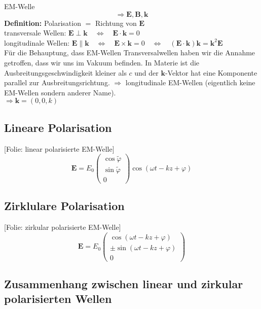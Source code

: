 \documentclass[titlepage,11pt,a4paper,ngerman]{report}
\newcommand{\folie}[1]{\color{gray}[Folie: #1]\color{black}}
\renewcommand{\vec}[1]{\boldsymbol{#1}}
\newcommand{\lcom}[1]{\color{MidnightBlue}#1\color{black}}
\begin{document}
EM-Welle
\begin{equation*}
\Rightarrow \vec{E},\vec{B},\vec{k}
\end{equation*}
\textbf{Definition: } Polarisation $ \widehat{=} $ Richtung von $ \vec{E} $\\
transversale Wellen: $ \vec{E} \perp \vec{k} \quad \Leftrightarrow \quad \vec{E} \cdot \vec{k} = 0 $\\
longitudinale Wellen: $ \vec{E} \parallel \vec{k} \quad \Leftrightarrow \quad \vec{E} \times \vec{k} = 0 \quad \Leftrightarrow \quad \left(\vec{E} \cdot \vec{k}\right) \vec{k} = \vec{k}^2 \vec{E} $\\
\lcom{Für die Behauptung, dass EM-Wellen Transversalwellen haben wir die Annahme getroffen, dass wir uns im Vakuum befinden. In Materie ist die Ausbreitungsgeschwindigkeit kleiner als $ c $ und der $ \vec{k} $-Vektor hat eine Komponente parallel zur Ausbreitungsrichtung. $ \Rightarrow $ longitudinale EM-Wellen (eigentlich keine EM-Wellen sondern anderer Name).}\\
$ \Rightarrow \vec{k} = (0,0,k) $

\subsection{Lineare Polarisation}

\folie{linear polarisierte EM-Welle}
\begin{equation*}
\vec{E} = E_0 \begin{pmatrix}
\cos \tilde{\varphi} \\ \sin \tilde{\varphi} \\ 0
\end{pmatrix} \cos \left(\omega t - k z + \varphi \right)
\end{equation*}

\subsection{Zirklulare Polarisation}

\folie{zirkular polarisierte EM-Welle}
\begin{equation*}
\vec{E} = E_0 \begin{pmatrix}
\cos \left(\omega t - kz + \varphi \right) \\ \pm\sin\left(\omega t - k z + \varphi\right) \\ 0
\end{pmatrix}
\end{equation*}

\subsection{Zusammenhang zwischen linear und zirkular polarisierten Wellen}
\end{document}
